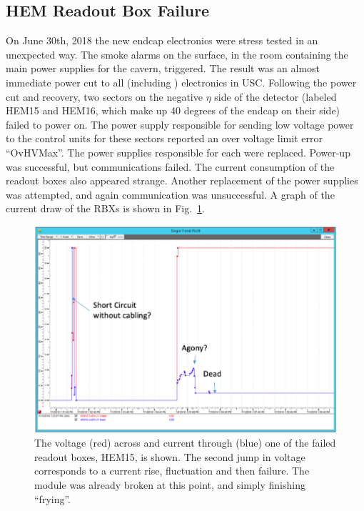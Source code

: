 \subsection{HEM Readout Box Failure}
On June 30th, 2018 the new endcap electronics were stress tested in an unexpected way. The smoke alarms on the surface, in the room containing the main power supplies for the cavern, triggered. The result was an almost immediate power cut to all \CMS (including \HCAL) electronics in USC. Following the power cut and recovery, two sectors on the negative \ensuremath{\eta} side of the detector (labeled HEM15 and HEM16, which make up 40 degrees of the endcap on their side) failed to power on. The power supply responsible for sending low voltage power to the control units for these sectors reported an over voltage limit error ``OvHVMax''. The power supplies responsible for each were replaced.  Power-up was successful, but communications failed. The current consumption of the readout boxes also appeared strange. Another replacement of the power supplies was attempted, and again communication was unsuccessful. A graph of the current draw of the RBXs is shown in Fig.~\ref{fig:dyingRBX}.

\begin{figure}[!tp]
    \centering
    \includegraphics[width=\textwidth]{figures/DYINGRBX.png}
    \caption[
       Failure of HEM15 RBX.
    ]{
        The voltage (red) across and current through (blue) one of the failed readout boxes, HEM15, is shown. The second jump in voltage corresponds to a current rise, fluctuation and then failure. The module was already broken at this point, and simply finishing ``frying''.  
    }
    \label{fig:dyingRBX}
\end{figure}

